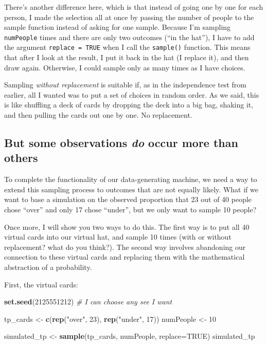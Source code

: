 \documentclass[openany]{book}
\newenvironment{Shaded}{\begin{snugshade}}{\end{snugshade}}
\newcommand{\CommentTok}[1]{\textcolor[rgb]{0.56,0.35,0.01}{\textit{#1}}}
\newcommand{\DataTypeTok}[1]{\textcolor[rgb]{0.13,0.29,0.53}{#1}}
\newcommand{\DecValTok}[1]{\textcolor[rgb]{0.00,0.00,0.81}{#1}}
\newcommand{\KeywordTok}[1]{\textcolor[rgb]{0.13,0.29,0.53}{\textbf{#1}}}
\newcommand{\NormalTok}[1]{#1}
\newcommand{\OtherTok}[1]{\textcolor[rgb]{0.56,0.35,0.01}{#1}}
\newcommand{\StringTok}[1]{\textcolor[rgb]{0.31,0.60,0.02}{#1}}
\begin{document}
There's another difference here, which is that instead of going one by one for each person, I made the selection all at once by passing the number of people to the sample function instead of asking for one sample. Because I'm sampling \texttt{numPeople} times and there are only two outcomes (``in the hat''), I have to add the argument \texttt{replace\ =\ TRUE} when I call the \texttt{sample()} function. This means that after I look at the result, I put it back in the hat (I replace it), and then draw again. Otherwise, I could sample only as many times as I have choices.

Sampling \emph{without replacement} is suitable if, as in the independence test from earlier, all I wanted was to put a set of choices in random order. As we said, this is like shuffling a deck of cards by dropping the deck into a big bag, shaking it, and then pulling the cards out one by one. No replacement.

\hypertarget{but-some-observations-do-occur-more-than-others}{%
\subsection*{\texorpdfstring{But some observations \emph{do} occur more than others}{But some observations do occur more than others}}\label{but-some-observations-do-occur-more-than-others}}

To complete the functionality of our data-generating machine, we need a way to extend this sampling process to outcomes that are not equally likely. What if we want to base a simulation on the observed proportion that 23 out of 40 people chose ``over'' and only 17 chose ``under'', but we only want to sample 10 people?

Once more, I will show you two ways to do this. The first way is to put all 40 virtual cards into our virtual hat, and sample 10 times (with or without replacement? what do you think?). The second way involves abandoning our connection to these virtual cards and replacing them with the mathematical abstraction of a probability.

First, the virtual cards:

\begin{Shaded}
\begin{Highlighting}[]
\KeywordTok{set.seed}\NormalTok{(}\DecValTok{2125551212}\NormalTok{) }\CommentTok{# I can choose any see I want}

\NormalTok{tp_cards <-}\StringTok{ }\KeywordTok{c}\NormalTok{(}\KeywordTok{rep}\NormalTok{(}\StringTok{"over"}\NormalTok{, }\DecValTok{23}\NormalTok{), }\KeywordTok{rep}\NormalTok{(}\StringTok{"under"}\NormalTok{, }\DecValTok{17}\NormalTok{))}
\NormalTok{numPeople <-}\StringTok{ }\DecValTok{10}

\NormalTok{simulated_tp <-}\StringTok{ }\KeywordTok{sample}\NormalTok{(tp_cards, numPeople, }\DataTypeTok{replace=}\OtherTok{TRUE}\NormalTok{)}
\NormalTok{simulated_tp}
\end{Highlighting}
\end{Shaded}
\end{document}
